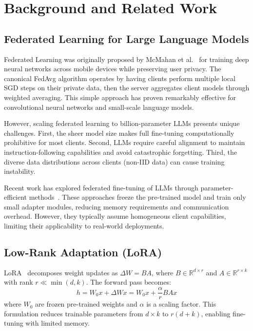 \documentclass[conference]{IEEEtran}
\begin{document}
\section{Background and Related Work}
\label{sec:background}

\subsection{Federated Learning for Large Language Models}

Federated Learning was originally proposed by McMahan et al.~\cite{mcmahan2017fedavg} for training deep neural networks across mobile devices while preserving user privacy. The canonical FedAvg algorithm operates by having clients perform multiple local SGD steps on their private data, then the server aggregates client models through weighted averaging. This simple approach has proven remarkably effective for convolutional neural networks and small-scale language models.

However, scaling federated learning to billion-parameter LLMs presents unique challenges. First, the sheer model size makes full fine-tuning computationally prohibitive for most clients. Second, LLMs require careful alignment to maintain instruction-following capabilities and avoid catastrophic forgetting. Third, the diverse data distributions across clients (non-IID data) can cause training instability.

Recent work has explored federated fine-tuning of LLMs through parameter-efficient methods~\cite{chen2023fedllm}. These approaches freeze the pre-trained model and train only small adapter modules, reducing memory requirements and communication overhead. However, they typically assume homogeneous client capabilities, limiting their applicability to real-world deployments.

\subsection{Low-Rank Adaptation (LoRA)}

LoRA~\cite{hu2021lora} decomposes weight updates as $\Delta W = BA$, where $B \in \mathbb{R}^{d \times r}$ and $A \in \mathbb{R}^{r \times k}$ with rank $r \ll \min(d,k)$. The forward pass becomes:
\begin{equation}
h = W_0 x + \Delta W x = W_0 x + \frac{\alpha}{r} BA x
\end{equation}
where $W_0$ are frozen pre-trained weights and $\alpha$ is a scaling factor. This formulation reduces trainable parameters from $d \times k$ to $r(d+k)$, enabling fine-tuning with limited memory.
\end{document}
